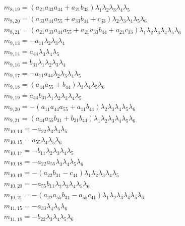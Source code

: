 \documentclass{article}
\begin{document}
\begin{align*}
&m_{8,19}={\left(a_{21} a_{33} a_{44} + a_{21} b_{33}\right)} \lambda_{1} \lambda_{2} \lambda_{3} \lambda_{4} \lambda_{5}\\
&m_{8,20}={\left(a_{33} a_{44} a_{55} + a_{33} b_{44} + c_{33}\right)} \lambda_{2} \lambda_{3} \lambda_{4} \lambda_{5} \lambda_{6}\\
&m_{8,21}={\left(a_{21} a_{33} a_{44} a_{55} + a_{21} a_{33} b_{44} + a_{21} c_{33}\right)} \lambda_{1} \lambda_{2} \lambda_{3} \lambda_{4} \lambda_{5} \lambda_{6}\\
&m_{9,13}=-a_{11} \lambda_{2} \lambda_{3} \lambda_{4}\\
&m_{9,14}=a_{44} \lambda_{3} \lambda_{4} \lambda_{5}\\
&m_{9,16}=b_{31} \lambda_{1} \lambda_{2} \lambda_{3} \lambda_{4}\\
&m_{9,17}=-a_{11} a_{44} \lambda_{2} \lambda_{3} \lambda_{4} \lambda_{5}\\
&m_{9,18}={\left(a_{44} a_{55} + b_{44}\right)} \lambda_{3} \lambda_{4} \lambda_{5} \lambda_{6}\\
&m_{9,19}=a_{44} b_{31} \lambda_{1} \lambda_{2} \lambda_{3} \lambda_{4} \lambda_{5}\\
&m_{9,20}=-{\left(a_{11} a_{44} a_{55} + a_{11} b_{44}\right)} \lambda_{2} \lambda_{3} \lambda_{4} \lambda_{5} \lambda_{6}\\
&m_{9,21}={\left(a_{44} a_{55} b_{31} + b_{31} b_{44}\right)} \lambda_{1} \lambda_{2} \lambda_{3} \lambda_{4} \lambda_{5} \lambda_{6}\\
&m_{10,14}=-a_{22} \lambda_{3} \lambda_{4} \lambda_{5}\\
&m_{10,15}=a_{55} \lambda_{4} \lambda_{5} \lambda_{6}\\
&m_{10,17}=-b_{11} \lambda_{2} \lambda_{3} \lambda_{4} \lambda_{5}\\
&m_{10,18}=-a_{22} a_{55} \lambda_{3} \lambda_{4} \lambda_{5} \lambda_{6}\\
&m_{10,19}=-{\left(a_{22} b_{31} - c_{41}\right)} \lambda_{1} \lambda_{2} \lambda_{3} \lambda_{4} \lambda_{5}\\
&m_{10,20}=-a_{55} b_{11} \lambda_{2} \lambda_{3} \lambda_{4} \lambda_{5} \lambda_{6}\\
&m_{10,21}=-{\left(a_{22} a_{55} b_{31} - a_{55} c_{41}\right)} \lambda_{1} \lambda_{2} \lambda_{3} \lambda_{4} \lambda_{5} \lambda_{6}\\
&m_{11,15}=-a_{33} \lambda_{4} \lambda_{5} \lambda_{6}\\
&m_{11,18}=-b_{22} \lambda_{3} \lambda_{4} \lambda_{5} \lambda_{6}\\
\end{align*}
\end{document}
